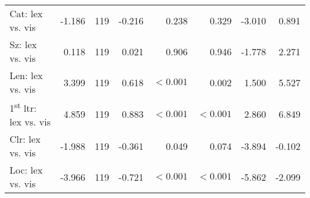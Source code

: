 \begin{tabular}{lrrrrrrr}
Cat: lex vs. vis                       &    -1.186 & 119 &      -0.216 &           0.238 &                 0.329 &                -3.010 &                 0.891 \\
Sz: lex vs. vis                        &     0.118 & 119 &       0.021 &           0.906 &                 0.946 &                -1.778 &                 2.271 \\
Len: lex vs. vis                       &     3.399 & 119 &       0.618 &       $< 0.001$ &                 0.002 &                 1.500 &                 5.527 \\
1\textsuperscript{st} ltr: lex vs. vis &     4.859 & 119 &       0.883 &       $< 0.001$ &             $< 0.001$ &                 2.860 &                 6.849 \\
Clr: lex vs. vis                       &    -1.988 & 119 &      -0.361 &           0.049 &                 0.074 &                -3.894 &                -0.102 \\
Loc: lex vs. vis                       &    -3.966 & 119 &      -0.721 &       $< 0.001$ &             $< 0.001$ &                -5.862 &                -2.099 \\
\bottomrule
\end{tabular}

